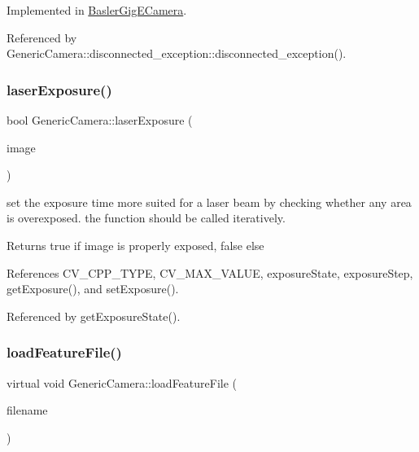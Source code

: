 Implemented in \hyperlink{classBaslerGigECamera_a1690e409075c423eec92a039781989df}{Basler\+Gig\+E\+Camera}.



Referenced by Generic\+Camera\+::disconnected\+\_\+exception\+::disconnected\+\_\+exception().

\mbox{\label{classGenericCamera_ad20a7c33465d6791563f77a637ceed83}} 
\subsubsection{\texorpdfstring{laser\+Exposure()}{laserExposure()}}
{\footnotesize\ttfamily bool Generic\+Camera\+::laser\+Exposure (\begin{DoxyParamCaption}\item[{cv\+::\+Mat \&}]{image }\end{DoxyParamCaption})\hspace{0.3cm}{\ttfamily [virtual]}}

set the exposure time more suited for a laser beam by checking whether any area is overexposed. the function should be called iteratively. \begin{DoxyReturn}{Returns}
true if image is properly exposed, false else 
\end{DoxyReturn}


References C\+V\+\_\+\+C\+P\+P\+\_\+\+T\+Y\+PE, C\+V\+\_\+\+M\+A\+X\+\_\+\+V\+A\+L\+UE, exposure\+State, exposure\+Step, get\+Exposure(), and set\+Exposure().



Referenced by get\+Exposure\+State().

\mbox{\label{classGenericCamera_a393e01ba0b1bc18ad43f00cc62ccea4e}} 
\subsubsection{\texorpdfstring{load\+Feature\+File()}{loadFeatureFile()}}
{\footnotesize\ttfamily virtual void Generic\+Camera\+::load\+Feature\+File (\begin{DoxyParamCaption}\item[{const std\+::string}]{filename }\end{DoxyParamCaption})\hspace{0.3cm}{\ttfamily [pure virtual]}}

